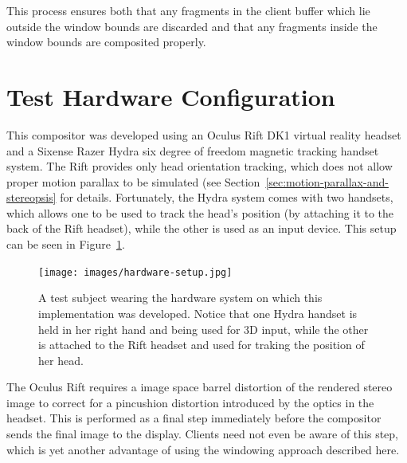 This process ensures both that any fragments in the client buffer which lie outside the window bounds are discarded and that any fragments inside the window bounds are composited properly.


\section{Test Hardware Configuration}

This compositor was developed using an Oculus Rift DK1 virtual reality headset and a Sixense Razer Hydra six degree of freedom magnetic tracking handset system. The Rift provides only head orientation tracking, which does not allow proper motion parallax to be simulated (see Section~\ref{sec:motion-parallax-and-stereopsis} for details. Fortunately, the Hydra system comes with two handsets, which allows one to be used to track the head's position (by attaching it to the back of the Rift headset), while the other is used as an input device. This setup can be seen in Figure~\ref{fig:hardware-setup}.

\begin{figure}[ht!]
\centering
\texttt{[image: images/hardware-setup.jpg]}
\caption{A test subject wearing the hardware system on which this implementation was developed. Notice that one Hydra handset is held in her right hand and being used for 3D input, while the other is attached to the Rift headset and used for traking the position of her head.}
\label{fig:hardware-setup}
\end{figure}

The Oculus Rift requires a image space barrel distortion of the rendered stereo image to correct for a pincushion distortion introduced by the optics in the headset. This is performed as a final step immediately before the compositor sends the final image to the display. Clients need not even be aware of this step, which is yet another advantage of using the windowing approach described here.











